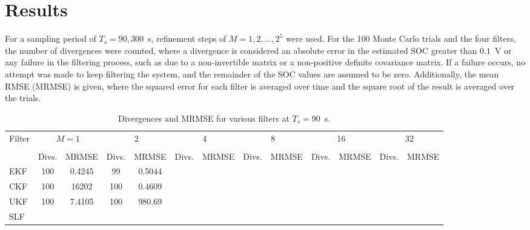 \documentclass[../zhang_thesis.tex]{subfiles}
\begin{document}
\chapter{Results}


For a sampling period of $T_s=90,300$~s, refinement steps of $M=1,2,\dots,2^5$ were used. For the 100 Monte Carlo trials and the four filters, the number of divergences were counted, where a divergence is considered an absolute error in the estimated SOC greater than $0.1$~V or any failure in the filtering process, such as due to a non-invertible matrix or a non-positive definite covariance matrix. If a failure occurs, no attempt was made to keep filtering the system, and the remainder of
the SOC values are assumed to be zero. Additionally, the mean RMSE (MRMSE) is given, where the squared error for each filter is averaged over
time and the square root of the result is averaged over the trials.

\begin{sidewaystable}
\caption{Divergences and MRMSE for various filters at $T_s=90$~s.}
\centering
\begin{tabular}{l*{12}{c}}
\toprule
Filter & \multicolumn{2}{c}{$M=1$} & \multicolumn{2}{c}{2} & \multicolumn{2}{c}{4} & \multicolumn{2}{c}{8} & \multicolumn{2}{c}{16} & \multicolumn{2}{c}{32} \\
\cmidrule(r){2-3} \cmidrule(lr){4-5} \cmidrule(lr){6-7} \cmidrule(lr){8-9} \cmidrule(lr){10-11} \cmidrule(lr){12-13} \\
& Divs. & MRMSE & Divs. & MRMSE & Divs. & MRMSE & Divs. & MRMSE & Divs. & MRMSE & Divs. & MRMSE \\
\midrule
EKF & 100 & 0.4245 &  99 & 0.5044 \\
CKF & 100 & 16202  & 100 & 0.4609 \\
UKF & 100 & 7.4105 & 100 & 980.69 \\
SLF \\
\bottomrule
\end{tabular}
\end{sidewaystable}
\end{document}
